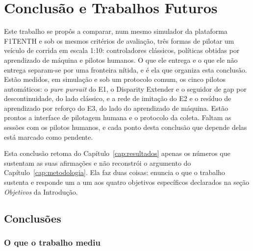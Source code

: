 
\chapter*[Conclusão e Trabalhos Futuros]{Conclusão e Trabalhos Futuros}\label{cap:conclusao}

Este trabalho se propôs a comparar, num mesmo simulador da plataforma F1TENTH e
sob os mesmos critérios de avaliação, três formas de pilotar um veículo de
corrida em escala 1:10: controladores clássicos, políticas obtidas por
aprendizado de máquina e pilotos humanos. O que ele entrega e o que ele não
entrega separam-se por uma fronteira nítida, e é ela que organiza esta
conclusão. Estão medidos, em simulação e sob um protocolo comum, os cinco pilotos
automáticos: o \textit{pure pursuit} do E1, o Disparity Extender e o seguidor de
gap por descontinuidade, do lado clássico, e a rede de imitação do E2 e o resíduo
de aprendizado por reforço do E3, do lado do aprendizado de máquina. Estão
prontos a interface de pilotagem humana e o protocolo da coleta. Faltam as
sessões com os pilotos humanos, e cada ponto desta conclusão que depende delas
está marcado como pendente.

Esta conclusão retoma do Capítulo~\ref{cap:resultados} apenas os números que
sustentam as suas afirmações e não reconstrói o argumento do
Capítulo~\ref{cap:metodologia}. Ela faz duas coisas:
enuncia o que o trabalho sustenta e responde um a um aos quatro objetivos
específicos declarados na seção \textit{Objetivos} da Introdução.

\section*{Conclusões}

\subsection*{O que o trabalho mediu}


